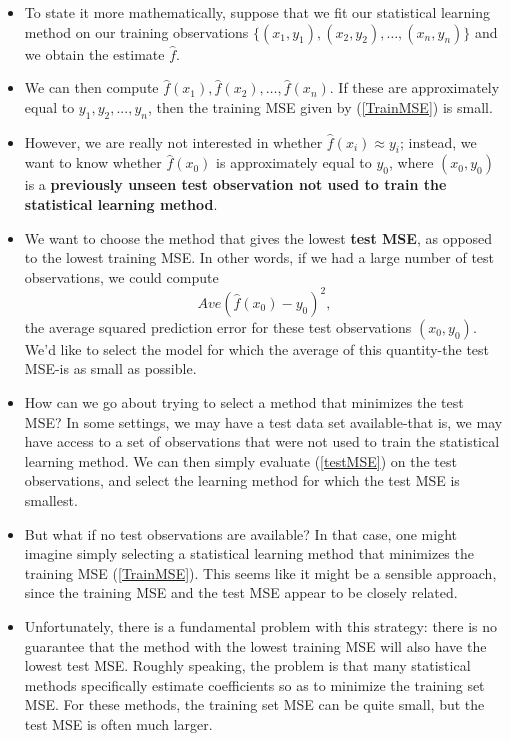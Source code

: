 \documentclass[10pt,a4paper]{beamer}
\begin{document}
\begin{frame}{}
\begin{itemize}
  \item To state it more mathematically, suppose that we fit our statistical learning method on our training observations $\{(x_1,y_1),(x_2,y_2),\dots,(x_n,y_n)\}$ and we obtain the estimate $\hat{f}$.
  \item We can then compute $\hat{f}(x_1), \hat{f}(x_2),\dots,\hat{f}(x_n)$. If these are approximately equal to $y_1,y_2,...,y_n$, then the training MSE given by (\ref{TrainMSE}) is small.
  \item However, we are really not interested in whether $\hat{f}(x_i) \approx y_i$; instead, we want to know whether $\hat{f}(x_0)$ is approximately equal to $y_0$, where $(x_0,y_0)$ is a \textbf{previously unseen test observation not used to train the statistical learning method}.
  \item We want to choose the method that gives
the lowest \textbf{test MSE}, as opposed to the lowest training MSE. In other words, if we had a large number of test observations, we could compute
\begin{equation}\label{testMSE}
  Ave(\hat{f}(x_0)-y_0)^2,
\end{equation}
the average squared prediction error for these test observations $(x_0,y_0)$.
We'd like to select the model for which the average of this quantity-the
test MSE-is as small as possible.

\end{itemize}

\end{frame}


\begin{frame}{}
\begin{itemize}\small
  \item How can we go about trying to select a method that minimizes the test
MSE? In some settings, we may have a test data set available-that is,
we may have access to a set of observations that were not used to train
the statistical learning method. We can then simply evaluate (\ref{testMSE}) on the test observations, and select the learning method for which the test MSE is smallest.
 \item But what if no test observations are available? In that case, one might imagine simply selecting a statistical learning method that minimizes the training MSE (\ref{TrainMSE}). This seems like it might be a sensible approach, since the training MSE and the test MSE appear to be closely related.
  \item Unfortunately, there is a fundamental problem with this strategy: there
is no guarantee that the method with the lowest training MSE will also
have the lowest test MSE. Roughly speaking, the problem is that many
statistical methods specifically estimate coefficients so as to minimize the
training set MSE. For these methods, the training set MSE can be quite
small, but the test MSE is often much larger.
\end{itemize}


\end{frame}
\end{document}
